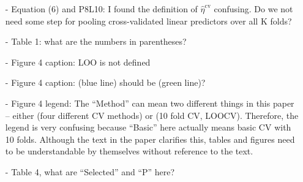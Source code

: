\documentclass[12]{article}
\newcommand{\re}{\textbf{Response: }}
\newcommand\bd[1]{{\color{blue}#1}}
\newcommand{\boldeta}{\boldsymbol\eta}
\begin{document}
\begin{enumerate}[align = left]
\begin{itemize}[align = left]
\item[-]  Equation (6) and P8L10: I found the definition of $\hat{\eta}^{\text{cv}}$ confusing. Do we not need some step for pooling cross-validated linear predictors over all K folds?

 
\item[-]  Table 1: what are the numbers in parentheses? 


\item[-] Figure 4 caption: LOO is not defined


\item[-]  Figure 4 caption: (blue line) should be (green line)?


\item[-]  Figure 4 legend: The “Method” can mean two different things in this paper – either (four different CV methods) or (10 fold CV, LOOCV). Therefore, the legend is very confusing because “Basic” here actually means basic CV with 10 folds. Although the text in the paper clarifies this, tables and figures need to be understandable by themselves without reference to the text.


\item[-]  Table 4, what are “Selected” and “P” here?


\end{itemize}
\end{enumerate}
\end{document}
